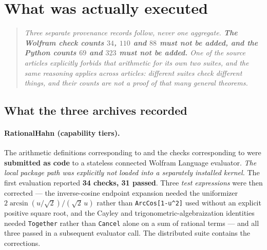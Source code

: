 \documentclass[11pt,letterpaper]{article}
\numberwithin{equation}{section}
\theoremstyle{definition}
\theoremstyle{remark}
\begin{document}
\section{What was actually executed}
\label{cas:sec-executed}

\begin{quote}\small\itshape
Three separate provenance records follow, never one aggregate. \textbf{The
Wolfram check counts $34$, $110$ and $88$ must not be added, and the Python
counts $69$ and $323$ must not be added.} One of the source articles explicitly
forbids that arithmetic for its own two suites, and the same reasoning applies
across articles: different suites check different things, and their counts are
not a proof of that many general theorems.
\end{quote}

\subsection{What the three archives recorded}
\label{cas:sub-recorded}

\paragraph{RationalHahn (capability tiers).}
The arithmetic definitions corresponding to  and the
checks corresponding to  were \textbf{submitted as code} to a
stateless connected Wolfram Language evaluator. \emph{The local package path was
explicitly not loaded into a separately installed kernel.} The first evaluation
reported \textbf{34 checks, 31 passed}. Three \emph{test expressions} were then
corrected --- the inverse-cosine endpoint expansion needed the uniformizer
$2\arcsin(u/\sqrt2)/(\sqrt2\,u)$ rather than \texttt{ArcCos[1-u\^{}2]} used
without an explicit positive square root, and the Cayley and
trigonometric-algebraization identities needed \texttt{Together} rather than
\texttt{Cancel} alone on a sum of rational terms --- and all three passed in a
subsequent evaluator call. The distributed suite contains the corrections.
\end{document}
